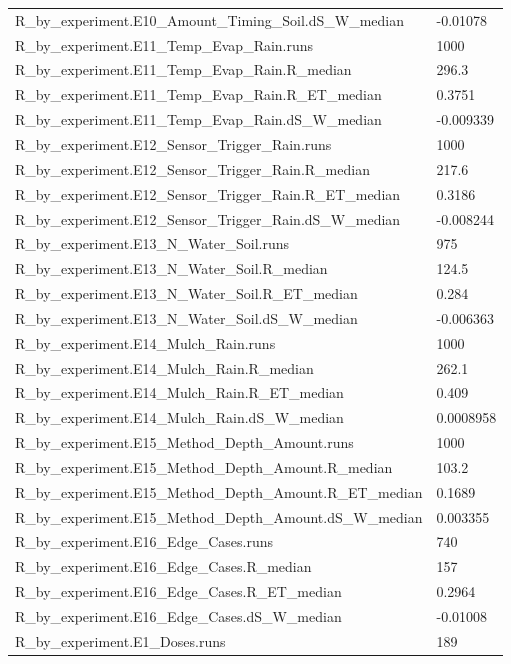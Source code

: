 {\begin{longtable}{p{}p{}}
{}R\_by\_experiment.E10\_Amount\_Timing\_Soil.dS\_W\_median & -0.01078\\
{}R\_by\_experiment.E11\_Temp\_Evap\_Rain.runs & 1000\\
{}R\_by\_experiment.E11\_Temp\_Evap\_Rain.R\_median & 296.3\\
{}R\_by\_experiment.E11\_Temp\_Evap\_Rain.R\_ET\_median & 0.3751\\
{}R\_by\_experiment.E11\_Temp\_Evap\_Rain.dS\_W\_median & -0.009339\\
{}R\_by\_experiment.E12\_Sensor\_Trigger\_Rain.runs & 1000\\
{}R\_by\_experiment.E12\_Sensor\_Trigger\_Rain.R\_median & 217.6\\
{}R\_by\_experiment.E12\_Sensor\_Trigger\_Rain.R\_ET\_median & 0.3186\\
{}R\_by\_experiment.E12\_Sensor\_Trigger\_Rain.dS\_W\_median & -0.008244\\
{}R\_by\_experiment.E13\_N\_Water\_Soil.runs & 975\\
{}R\_by\_experiment.E13\_N\_Water\_Soil.R\_median & 124.5\\
{}R\_by\_experiment.E13\_N\_Water\_Soil.R\_ET\_median & 0.284\\
{}R\_by\_experiment.E13\_N\_Water\_Soil.dS\_W\_median & -0.006363\\
{}R\_by\_experiment.E14\_Mulch\_Rain.runs & 1000\\
{}R\_by\_experiment.E14\_Mulch\_Rain.R\_median & 262.1\\
{}R\_by\_experiment.E14\_Mulch\_Rain.R\_ET\_median & 0.409\\
{}R\_by\_experiment.E14\_Mulch\_Rain.dS\_W\_median & 0.0008958\\
{}R\_by\_experiment.E15\_Method\_Depth\_Amount.runs & 1000\\
{}R\_by\_experiment.E15\_Method\_Depth\_Amount.R\_median & 103.2\\
{}R\_by\_experiment.E15\_Method\_Depth\_Amount.R\_ET\_median & 0.1689\\
{}R\_by\_experiment.E15\_Method\_Depth\_Amount.dS\_W\_median & 0.003355\\
{}R\_by\_experiment.E16\_Edge\_Cases.runs & 740\\
{}R\_by\_experiment.E16\_Edge\_Cases.R\_median & 157\\
{}R\_by\_experiment.E16\_Edge\_Cases.R\_ET\_median & 0.2964\\
{}R\_by\_experiment.E16\_Edge\_Cases.dS\_W\_median & -0.01008\\
{}R\_by\_experiment.E1\_Doses.runs & 189\\

\end{longtable}}
